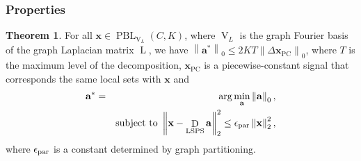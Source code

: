 \documentclass[journal,twocolumn,10pt]{IEEEtran}
\theoremstyle{definition}
\newtheorem{myThm}{Theorem}
\def\a{\mathbf{a}}
\def\x{\mathbf{x}}
\DeclareMathOperator{\LL}{L}
\DeclareMathOperator{\PC}{PC}
\DeclareMathOperator{\PBL}{PBL}
\DeclareMathOperator{\D}{D}
\DeclareMathOperator{\Vm}{V}
\begin{document}
\subsubsection{Properties}
\begin{myThm}
\label{thm:PPL}
For all $\x \in \PBL_{\Vm_L}(C,K)$, where $\Vm_L$ is the graph Fourier basis of the graph Laplacian matrix $\LL$,   we have $\left\| \a^* \right\|_0 \leq  2 K T\left\|  \Delta \x_{\PC} \right\|_0$, where $T$ is the maximum level of the decomposition, $\x_{\PC}$ is a piecewise-constant signal that corresponds the same local sets with $\x$ and
\begin{eqnarray*}
   \a^* &  = &   \arg \min_{\a}   \left\| \a \right\|_0,
   \\
   && {\rm subject~to~}  \left\| \x - \D_{\rm LSPS} \a \right\|_2^2 \leq \epsilon_{\rm par}  \left\| \x \right\|_2^2,
\end{eqnarray*}
where $\epsilon_{\rm par} $ is a constant determined by graph partitioning.
\end{myThm}
\end{document}
